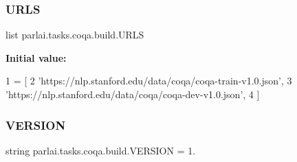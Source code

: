 \subsubsection{\texorpdfstring{U\+R\+LS}{URLS}}
{\footnotesize\ttfamily list parlai.\+tasks.\+coqa.\+build.\+U\+R\+LS}

{\bfseries Initial value\+:}
\begin{DoxyCode}
1 =  [
2     \textcolor{stringliteral}{'https://nlp.stanford.edu/data/coqa/coqa-train-v1.0.json'},
3     \textcolor{stringliteral}{'https://nlp.stanford.edu/data/coqa/coqa-dev-v1.0.json'},
4 ]
\end{DoxyCode}
\mbox{\label{namespaceparlai_1_1tasks_1_1coqa_1_1build_acfdb0f28d99e915a52ffeaa441f932f4}} 
\subsubsection{\texorpdfstring{V\+E\+R\+S\+I\+ON}{VERSION}}
{\footnotesize\ttfamily string parlai.\+tasks.\+coqa.\+build.\+V\+E\+R\+S\+I\+ON = \textquotesingle{}1.\textquotesingle{}}

